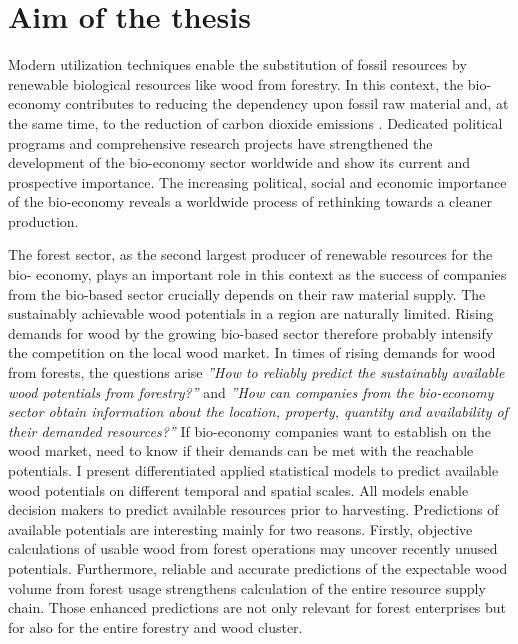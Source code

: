 \section{Aim of the thesis}
\label{sec:intro:aim}
Modern utilization techniques enable the substitution of fossil resources by renewable biological
resources like wood from forestry. In this context, the bio-economy contributes to reducing the
dependency upon fossil raw material and, at the same time, to the reduction of carbon dioxide
emissions \citep[p. 4]{ingrao_2016}. Dedicated political programs and comprehensive research projects have strengthened the development of the bio-economy sector worldwide and show its current and prospective importance. The increasing political, social and economic importance of the bio-economy \citep[e.g.][p. 15-16]{bmel_2014b} reveals a worldwide process of rethinking towards a cleaner production.

The forest sector, as the second largest producer of renewable resources for the bio-
economy, plays an important role in this context as the success of companies from the bio-based
sector crucially depends on their raw material supply. The sustainably achievable wood potentials in a region are naturally limited. Rising demands for wood by the growing bio-based sector therefore
probably intensify the competition on the local wood market. In times of rising demands for wood
from forests, the questions arise \textit{''How to reliably predict the sustainably available wood potentials from forestry?''} and \textit{''How can companies from the bio-economy sector obtain information about the location, property, quantity and availability of their demanded resources?''} If bio-economy companies want to establish on the wood market, need to know if their demands can be met with the reachable potentials. I present differentiated applied statistical models to predict available wood potentials on different temporal and spatial scales. All models enable decision makers to predict available resources prior to harvesting. Predictions of available potentials are interesting mainly for two reasons. Firstly, objective calculations of usable wood from forest operations may uncover recently unused potentials. Furthermore, reliable and accurate predictions of the expectable wood volume from forest usage strengthens calculation of the entire resource supply chain. Those enhanced predictions are not only relevant for forest enterprises but for also for the entire forestry and wood cluster.
	
